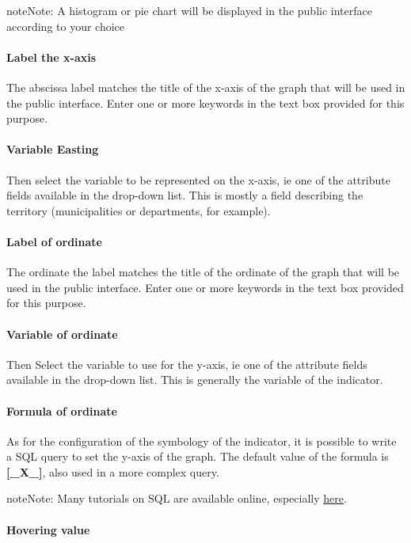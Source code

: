 \documentclass[letterpaper,10pt,english]{sphinxmanual}
\begin{document}
\begin{notice}{note}{Note:}
A histogram or pie chart will be displayed in the public interface according to your choice
\end{notice}
\paragraph{Label the x-axis}

The abscissa label matches the title of the x-axis of the graph that will be used in the public interface. Enter one or more keywords in the text box provided for this purpose.
\paragraph{Variable Easting}

Then select the variable to be represented on the x-axis, ie one of the attribute fields available in the drop-down list. This is mostly a field describing the territory (municipalities or departments, for example).
\paragraph{Label of ordinate}

The ordinate the label matches the title of the ordinate of the graph that will be used in the public interface. Enter one or more keywords in the text box provided for this purpose.
\paragraph{Variable of ordinate}

Then Select the variable to use for the y-axis, ie one of the attribute fields available in the drop-down list. This is generally the variable of the indicator.
\paragraph{Formula of ordinate}

As for the configuration of the symbology of the indicator, it is possible to write a SQL query to set the y-axis of the graph. The default value of the formula is \textbf{{[}\_X\_{]}}, also used in a more complex query.

\begin{notice}{note}{Note:}
Many tutorials on SQL are available online, especially \href{http://sql.developpez.com/}{here}.
\end{notice}
\paragraph{Hovering value}
\end{document}
